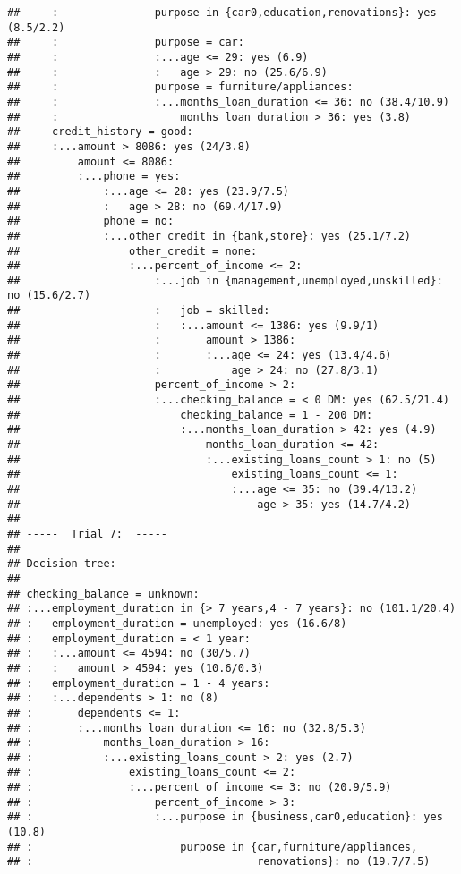 \documentclass[
]{article}
\begin{document}
\begin{verbatim}
##     :               purpose in {car0,education,renovations}: yes (8.5/2.2)
##     :               purpose = car:
##     :               :...age <= 29: yes (6.9)
##     :               :   age > 29: no (25.6/6.9)
##     :               purpose = furniture/appliances:
##     :               :...months_loan_duration <= 36: no (38.4/10.9)
##     :                   months_loan_duration > 36: yes (3.8)
##     credit_history = good:
##     :...amount > 8086: yes (24/3.8)
##         amount <= 8086:
##         :...phone = yes:
##             :...age <= 28: yes (23.9/7.5)
##             :   age > 28: no (69.4/17.9)
##             phone = no:
##             :...other_credit in {bank,store}: yes (25.1/7.2)
##                 other_credit = none:
##                 :...percent_of_income <= 2:
##                     :...job in {management,unemployed,unskilled}: no (15.6/2.7)
##                     :   job = skilled:
##                     :   :...amount <= 1386: yes (9.9/1)
##                     :       amount > 1386:
##                     :       :...age <= 24: yes (13.4/4.6)
##                     :           age > 24: no (27.8/3.1)
##                     percent_of_income > 2:
##                     :...checking_balance = < 0 DM: yes (62.5/21.4)
##                         checking_balance = 1 - 200 DM:
##                         :...months_loan_duration > 42: yes (4.9)
##                             months_loan_duration <= 42:
##                             :...existing_loans_count > 1: no (5)
##                                 existing_loans_count <= 1:
##                                 :...age <= 35: no (39.4/13.2)
##                                     age > 35: yes (14.7/4.2)
## 
## -----  Trial 7:  -----
## 
## Decision tree:
## 
## checking_balance = unknown:
## :...employment_duration in {> 7 years,4 - 7 years}: no (101.1/20.4)
## :   employment_duration = unemployed: yes (16.6/8)
## :   employment_duration = < 1 year:
## :   :...amount <= 4594: no (30/5.7)
## :   :   amount > 4594: yes (10.6/0.3)
## :   employment_duration = 1 - 4 years:
## :   :...dependents > 1: no (8)
## :       dependents <= 1:
## :       :...months_loan_duration <= 16: no (32.8/5.3)
## :           months_loan_duration > 16:
## :           :...existing_loans_count > 2: yes (2.7)
## :               existing_loans_count <= 2:
## :               :...percent_of_income <= 3: no (20.9/5.9)
## :                   percent_of_income > 3:
## :                   :...purpose in {business,car0,education}: yes (10.8)
## :                       purpose in {car,furniture/appliances,
## :                                   renovations}: no (19.7/7.5)

\end{verbatim}
\end{document}
